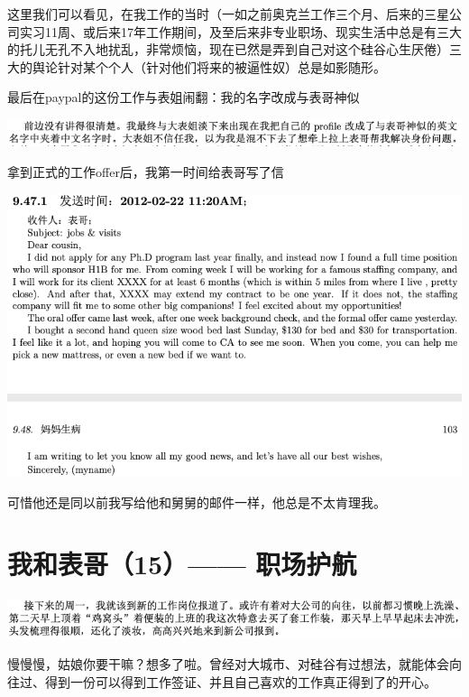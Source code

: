 \documentclass[9pt, b5paper]{article}
\begin{document}
这里我们可以看见，在我工作的当时（一如之前奥克兰工作三个月、后来的三星公司实习11周、或后来17年工作期间，及至后来非专业职场、现实生活中总是有三大的托儿无孔不入地扰乱，非常烦恼，现在已然是弄到自己对这个硅谷心生厌倦）三大的舆论针对某个个人（针对他们将来的被逼性奴）总是如影随形。

最后在paypal的这份工作与表姐闹翻：我的名字改成与表哥神似

\begin{center}
\includegraphics[width=.9\linewidth]{./pic/p1p123-2.png}
\end{center}

拿到正式的工作offer后，我第一时间给表哥写了信

\begin{center}
\includegraphics[width=.9\linewidth]{./pic/p1p103.png}
\end{center}

可惜他还是同以前我写给他和舅舅的邮件一样，他总是不太肯理我。 

\section{我和表哥（15）—— 职场护航}
\label{sec:org529c60f}

\begin{center}
\includegraphics[width=.9\linewidth]{./pic/p1p103-2.png}
\end{center}

慢慢慢，姑娘你要干嘛？想多了啦。曾经对大城市、对硅谷有过想法，就能体会向往过、得到一份可以得到工作签证、并且自己喜欢的工作真正得到了的开心。 
\end{document}
